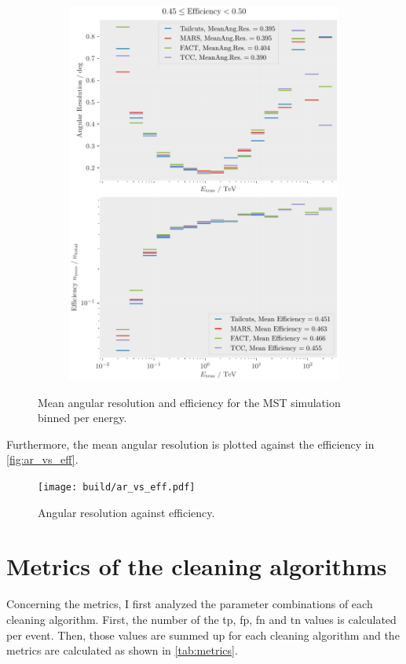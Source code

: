 \begin{figure}
\begin{subfigure}{0.48\textwidth}
        \includegraphics[width=\textwidth]{plots/ar_aeff/AR_Aeff_MST_0.45_0.50.pdf}
    \end{subfigure}
    \caption{Mean angular resolution and efficiency for the MST simulation binned per energy. }
    \label{fig:efficiency_angres}
\end{figure}

Furthermore, the mean angular resolution is plotted against the efficiency in \autoref{fig:ar_vs_eff}.

\begin{figure}
    \centering
    \texttt{[image: build/ar\_vs\_eff.pdf]}
    \caption{Angular resolution against efficiency.}
    \label{fig:ar_vs_eff}
\end{figure}


\section{Metrics of the cleaning algorithms}
\label{sec:metrics}
Concerning the metrics, I first analyzed the parameter combinations of each cleaning algorithm. First,
the number of the \gls{tp}, \gls{fp}, \gls{fn} and \gls{tn} values is calculated per event. Then,
those values are summed up for each cleaning algorithm and the metrics are calculated as shown in
\autoref{tab:metrics}.

